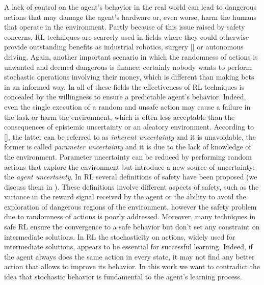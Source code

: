 A lack of control on the agent's behavior in the real world can lead to dangerous actions that may damage the agent's hardware or, even worse, harm the humans that operate in the environment. Partly because of this issue raised by safety concerns, \ac{RL} techniques are scarcely used in fields where they could otherwise provide outstanding benefits as industrial robotics, surgery [\cite{baek2018PathPlanning}] or autonomous driving. Again, another important scenario in which the randomness of actions is unwanted and deemed dangerous is finance: certainly nobody wants to perform stochastic operations involving their money, which is different than making bets in an informed way. In all of these fields the effectiveness of \ac{RL} techniques is concealed by the willingness to ensure a predictable agent's behavior. Indeed, even the single execution of a random and unsafe action may cause a failure in the task or harm the environment, which is often less acceptable than the consequences of epistemic uncertainty or an aleatory environment. According to [\cite{JMLR:v16:garcia15a}], the latter can be referred to as \emph{inherent uncertainty} and it is unavoidable, the former is called \emph{parameter uncertainty} and it is due to the lack of knowledge of the environment. Parameter uncertainty can be reduced by performing random actions that explore the environment but introduce a new source of uncertainty: the \emph{agent uncertainty}. In \ac{RL} several definitions of safety have been proposed (we discuss them in ). These definitions involve different aspects of safety, such as the variance in the reward signal received by the agent or the ability to avoid the exploration of dangerous regions of the environment, however the safety problem due to randomness of actions is poorly addressed. Moreover, many techniques in safe \ac{RL} ensure the convergence to a safe behavior but don't set any constraint on intermediate solutions. In \ac{RL} the stochasticity on actions, widely used for intermediate solutions, appears to be essential for successful learning. Indeed, if the agent always does the same action in every state, it may not find any better action that allows to improve its behavior. In this work we want to contradict the idea that stochastic behavior is fundamental to the agent's learning process.\\
\newline

